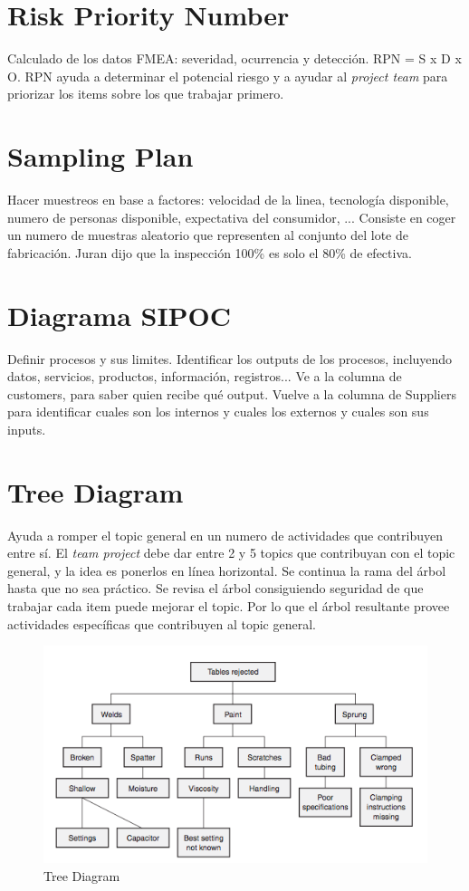\documentclass[oneside]{book}
\begin{document}
\section{Risk Priority Number}

Calculado de los datos FMEA: severidad, ocurrencia y detección. RPN = S x D x O. RPN ayuda a determinar el potencial riesgo y a ayudar al \textit{project team} para priorizar los items sobre los que trabajar primero.

\section{Sampling Plan}

Hacer muestreos en base a factores: velocidad de la linea, tecnología disponible, numero de personas disponible, expectativa del consumidor, ... 
Consiste en coger un numero de muestras aleatorio que representen al conjunto del lote de fabricación.
Juran dijo que la inspección 100\% es solo el 80\% de efectiva.

\section{Diagrama SIPOC}

Definir procesos y sus limites. Identificar los outputs de los procesos, incluyendo datos, servicios, productos, información, registros... Ve a la columna de customers, para saber quien recibe qué output. Vuelve a la columna de Suppliers para identificar cuales son los internos y cuales los externos y cuales son sus inputs.

\section{Tree Diagram}

Ayuda a romper el topic general en un numero de actividades que contribuyen entre sí. El \textit{team project} debe dar entre 2 y 5 topics que contribuyan con el topic general, y la idea es ponerlos en línea horizontal. Se continua la rama del árbol hasta que no sea práctico. Se revisa el árbol consiguiendo seguridad de que trabajar cada item puede mejorar el topic. Por lo que el árbol resultante provee actividades específicas que contribuyen al topic general.

\begin{figure}[ht!]
	\centering
	\includegraphics[width=120mm]{imagenes/TreeDiagram.png}
	\caption{Tree Diagram}
	\label{fig:TreeDiagram}
\end{figure}
\end{document}
